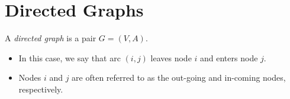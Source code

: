 \documentclass[12pt]{article}
\theoremstyle{definition}
\begin{document}
\section{Directed Graphs}
A \emph{directed graph} is a pair $G = (V, A)$.

\begin{itemize}
		\item In this case, we say that arc $(i,j)$ leaves node $i$ and enters node $j$.
		\item Nodes $i$ and $j$ are often referred to as the out-going and in-coming nodes, respectively. 
\end{itemize}
\end{document}
